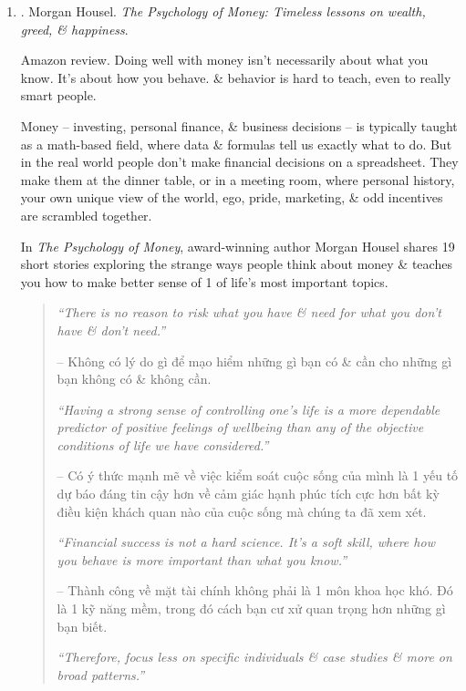 \documentclass{article}
\begin{document}
\begin{enumerate}
	\item \cite{Housel_money}. {\sc Morgan Housel}. {\it The Psychology of Money: Timeless lessons on wealth, greed, \& happiness}. {}

	{\sf Amazon review.} Doing well with money isn't necessarily about what you know. It's about how you behave. \& behavior is hard to teach, even to really smart people.

	Money -- investing, personal finance, \& business decisions -- is typically taught as a math-based field, where data \& formulas tell us exactly what to do. But in the real world people don't make financial decisions on a spreadsheet. They make them at the dinner table, or in a meeting room, where personal history, your own unique view of the world, ego, pride, marketing, \& odd incentives are scrambled together.

	In {\it The Psychology of Money}, award-winning author {\sc Morgan Housel} shares 19 short stories exploring the strange ways people think about money \& teaches you how to make better sense of 1 of life's most important topics.
	\begin{quotation}
		{\it``There is no reason to risk what you have \& need for what you don't have \& don't need.''}

		-- Không có lý do gì để mạo hiểm những gì bạn có \& cần cho những gì bạn không có \& không cần.

		{\it``Having a strong sense of controlling one's life is a more dependable predictor of positive feelings of wellbeing than any of the objective conditions of life we have considered.''}

		-- Có ý thức mạnh mẽ về việc kiểm soát cuộc sống của mình là 1 yếu tố dự báo đáng tin cậy hơn về cảm giác hạnh phúc tích cực hơn bất kỳ điều kiện khách quan nào của cuộc sống mà chúng ta đã xem xét.

		{\it``Financial success is not a hard science. It's a soft skill, where how you behave is more important than what you know.''}

		-- Thành công về mặt tài chính không phải là 1 môn khoa học khó. Đó là 1 kỹ năng mềm, trong đó cách bạn cư xử quan trọng hơn những gì bạn biết.

		{\it``Therefore, focus less on specific individuals \& case studies \& more on broad patterns.''}


\end{quotation}
\end{enumerate}
\end{document}
